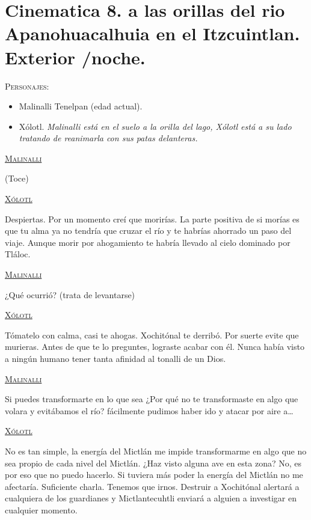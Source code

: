 \documentclass[11pt,letterpaper]{article}
\begin{document}
\section{Cinematica 8. a las orillas del rio Apanohuacalhuia en el Itzcuintlan. Exterior /noche.}
 \textsc{Personajes}:
 \begin{itemize}
 	\item Malinalli Tenelpan (edad actual).
	\item Xólotl.
\textit{Malinalli está en el suelo a la orilla del lago, Xólotl está a su lado tratando de reanimarla con sus patas delanteras.}
 \end{itemize}
 
\begin{center}
\textsc{\underline{Malinalli}}
\\
\par
(Toce)
\\
\par
\textsc{\underline{Xólotl}}
\\
\par
Despiertas. Por un momento creí que morirías. La parte positiva de si morías es que tu alma ya no tendría que cruzar el río y te habrías ahorrado un paso del viaje. Aunque morir por ahogamiento te habría llevado al cielo dominado por Tláloc.
\\
\par
\textsc{\underline{Malinalli}}
\\
\par
¿Qué ocurrió? (trata de levantarse)
\\
\par
\textsc{\underline{Xólotl}}
\\
\par
Tómatelo con calma, casi te ahogas. Xochitónal te derribó. Por suerte evite que murieras. Antes de que te lo preguntes, lograste acabar con él. Nunca había visto a ningún humano tener tanta afinidad al tonalli de un Dios. 
\\
\par
\textsc{\underline{Malinalli}}
\\
\par
Si puedes transformarte en lo que sea ¿Por qué no te transformaste en algo que volara y evitábamos el río? fácilmente pudimos haber ido y atacar por aire a…
\\
\par
\textsc{\underline{Xólotl}}
\\
\par
No es tan simple, la energía del Mictlán me impide transformarme en algo que no sea propio de cada nivel del Mictlán. ¿Haz visto alguna ave en esta zona? No, es por eso que no puedo hacerlo. Si tuviera más poder la energía del Mictlán no me afectaría. Suficiente charla. Tenemos que irnos. Destruir a Xochitónal alertará a cualquiera de los guardianes y Mictlantecuhtli enviará a alguien a investigar en cualquier momento.

\end{center}
\end{document}

